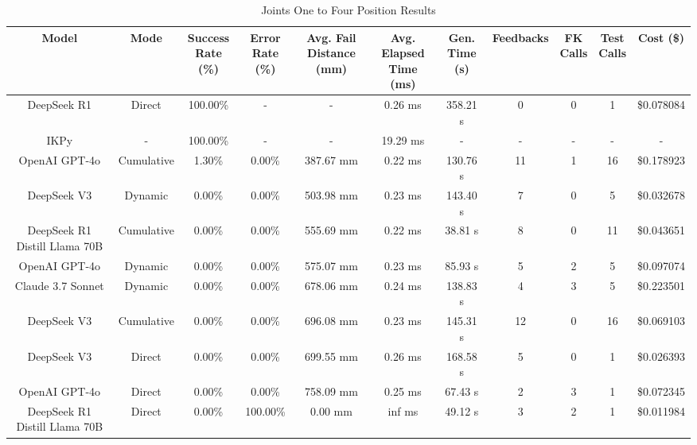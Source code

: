 \begin{landscape}
\begin{table}[H]
\tiny
\renewcommand{\arraystretch}{1.2}
\caption{Joints One to Four Position Results}
\begin{center}
\begin{tabular}{|c|c|c|c|c|c|c|c|c|c|c|}
    \hline
    \textbf{Model} & 
    \textbf{Mode} & 
    \makecell{\textbf{Success}\\\textbf{Rate (\%)}} &
    \makecell{\textbf{Error}\\\textbf{Rate (\%)}} &
    \makecell{\textbf{Avg. Fail}\\\textbf{Distance (mm)}} &
    \makecell{\textbf{Avg. Elapsed}\\\textbf{Time (ms)}} &
    \makecell{\textbf{Gen.}\\\textbf{Time (s)}} &
    \textbf{Feedbacks} &
    \makecell{\textbf{FK}\\\textbf{Calls}} &
    \makecell{\textbf{Test}\\\textbf{Calls}} &
    \textbf{Cost (\$)} \\
    \hline
    DeepSeek R1 & Direct & 100.00\% & - & - & 0.26 ms & 358.21 s & 0 & 0 & 1 & \$0.078084 \\
    \hline
    IKPy & - & 100.00\% & - & - & 19.29 ms & - & - & - & - & - \\
    \hline
    OpenAI GPT-4o & Cumulative & 1.30\% & 0.00\% & 387.67 mm & 0.22 ms & 130.76 s & 11 & 1 & 16 & \$0.178923 \\
    \hline
    DeepSeek V3 & Dynamic & 0.00\% & 0.00\% & 503.98 mm & 0.23 ms & 143.40 s & 7 & 0 & 5 & \$0.032678 \\
    \hline
    DeepSeek R1 Distill Llama 70B & Cumulative & 0.00\% & 0.00\% & 555.69 mm & 0.22 ms & 38.81 s & 8 & 0 & 11 & \$0.043651 \\
    \hline
    OpenAI GPT-4o & Dynamic & 0.00\% & 0.00\% & 575.07 mm & 0.23 ms & 85.93 s & 5 & 2 & 5 & \$0.097074 \\
    \hline
    Claude 3.7 Sonnet & Dynamic & 0.00\% & 0.00\% & 678.06 mm & 0.24 ms & 138.83 s & 4 & 3 & 5 & \$0.223501 \\
    \hline
    DeepSeek V3 & Cumulative & 0.00\% & 0.00\% & 696.08 mm & 0.23 ms & 145.31 s & 12 & 0 & 16 & \$0.069103 \\
    \hline
    DeepSeek V3 & Direct & 0.00\% & 0.00\% & 699.55 mm & 0.26 ms & 168.58 s & 5 & 0 & 1 & \$0.026393 \\
    \hline
    OpenAI GPT-4o & Direct & 0.00\% & 0.00\% & 758.09 mm & 0.25 ms & 67.43 s & 2 & 3 & 1 & \$0.072345 \\
    \hline
    DeepSeek R1 Distill Llama 70B & Direct & 0.00\% & 100.00\% & 0.00 mm & inf ms & 49.12 s & 3 & 2 & 1 & \$0.011984 \\
    \hline
\end{tabular}
\label{Results-Position-1-4}
\end{center}
\end{table}


\end{landscape}
